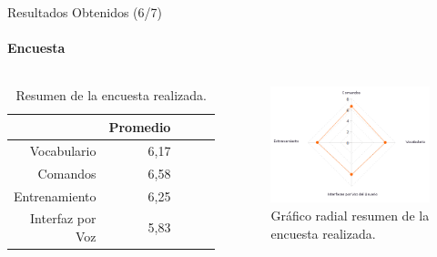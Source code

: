 \begin{frame}{Resultados Obtenidos (6/7)}
\framesubtitle{Encuesta}
\begin{columns}
\begin{table}[H] 
\centering
\tiny
\begin{tabular}{|r|r|r|r|r|}
\hline
            & Promedio \\
\hline
Vocabulario    & 6,17 \\
Comandos    & 6,58 \\
Entrenamiento  & 6,25 \\
Interfaz por Voz & 5,83 \\
\hline
\end{tabular}
\caption{Resumen de la encuesta realizada.}
\label{sec:tabla-encuesta}
\end{table} 
\begin{figure}[ht]
\centering
\includegraphics[width=1\linewidth]{./graphics/kiviat0.png}
\caption{Gr\'afico radial resumen de la encuesta realizada.}
\label{figure:kiviat-encuesta1}
\end{figure}
\end{columns}
\end{frame}

